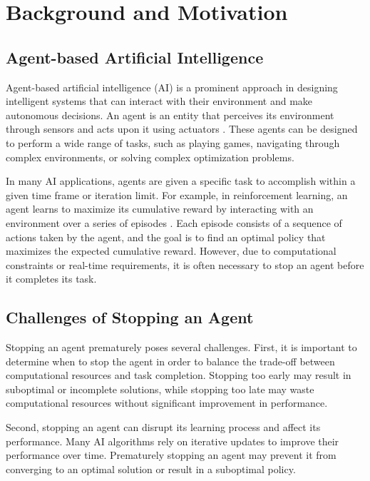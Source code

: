 \documentclass{article}
\begin{document}
\section{Background and Motivation}

\subsection{Agent-based Artificial Intelligence}

Agent-based artificial intelligence (AI) is a prominent approach in designing intelligent systems that can interact with their environment and make autonomous decisions. An agent is an entity that perceives its environment through sensors and acts upon it using actuators \cite{russell2016artificial}. These agents can be designed to perform a wide range of tasks, such as playing games, navigating through complex environments, or solving complex optimization problems.

In many AI applications, agents are given a specific task to accomplish within a given time frame or iteration limit. For example, in reinforcement learning, an agent learns to maximize its cumulative reward by interacting with an environment over a series of episodes \cite{sutton1998reinforcement}. Each episode consists of a sequence of actions taken by the agent, and the goal is to find an optimal policy that maximizes the expected cumulative reward. However, due to computational constraints or real-time requirements, it is often necessary to stop an agent before it completes its task.

\subsection{Challenges of Stopping an Agent}

Stopping an agent prematurely poses several challenges. First, it is important to determine when to stop the agent in order to balance the trade-off between computational resources and task completion. Stopping too early may result in suboptimal or incomplete solutions, while stopping too late may waste computational resources without significant improvement in performance.

Second, stopping an agent can disrupt its learning process and affect its performance. Many AI algorithms rely on iterative updates to improve their performance over time. Prematurely stopping an agent may prevent it from converging to an optimal solution or result in a suboptimal policy.
\end{document}
